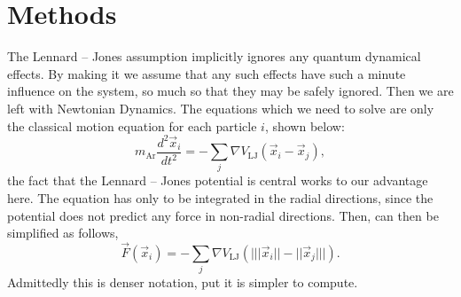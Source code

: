 \documentclass{IAYCPro}
\begin{document}
\raggedbottom
\newpage

\section{Methods}
\label{sct: Methods}
The Lennard -- Jones assumption implicitly ignores any quantum dynamical effects. By making it we assume that any such effects have such a minute influence on the system, so much so that they may be safely ignored. Then we are left with Newtonian Dynamics. The equations which we need to solve are only the classical motion equation for each particle $i$, shown below: 
\begin{equation}
    \label{eq:newton}
    m_\text{Ar} \frac{d^2 \vec{x}_i}{dt^2} = -\sum_j \nabla V_\text{LJ}(\vec{x}_i - \vec{x}_j),
\end{equation}
the fact that the Lennard -- Jones potential is central works to our advantage here. The equation has only to be integrated in the radial directions, since the potential does not predict any force in non-radial directions. Then, can then be simplified as follows,
\begin{equation}
    \label{eq:onedim}
    \vec{F}(\vec{x}_i) = -\sum_j \nabla V_\text{LJ} \left( \bigg| ||\vec{x}_i|| - ||\vec{x}_j|| \bigg| \right).
\end{equation}
Admittedly this is denser notation, put it is simpler to compute.
\end{document}
